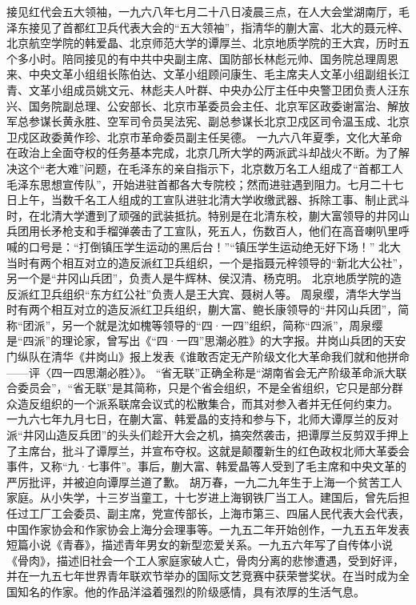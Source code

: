 \begin{maonote}
接见红代会五大领袖，一九六八年七月二十八日凌晨三点，在人大会堂湖南厅，毛泽东接见了首都红卫兵代表大会的“五大领袖”，指清华的蒯大富、北大的聂元梓、北京航空学院的韩爱晶、北京师范大学的谭厚兰、北京地质学院的王大宾，历时五个多小时。陪同接见的有中共中央副主席、国防部长林彪元帅、国务院总理周恩来、中央文革小组组长陈伯达、文革小组顾问康生、毛主席夫人文革小组副组长江青、文革小组成员姚文元、林彪夫人叶群、中央办公厅主任中央警卫团负责人汪东兴、国务院副总理、公安部长、北京市革委员会主任、北京军区政委谢富治、解放军总参谋长黄永胜、空军司令员吴法宪、副总参谋长北京卫戍区司令温玉成、北京卫戍区政委黄作珍、北京市革命委员副主任吴德。
一九六八年夏季，文化大革命在政治上全面夺权的任务基本完成，北京几所大学的两派武斗却战火不断。为了解决这个“老大难”问题，在毛泽东的亲自指示下，北京数万名工人组成了“首都工人毛泽东思想宣传队”，开始进驻首都各大专院校；然而进驻遇到阻力。七月二十七日上午，当数千名工人组成的工宣队进驻北清大学收缴武器、拆除工事、制止武斗时，在北清大学遭到了顽强的武装抵抗。特别是在北清东校，蒯大富领导的井冈山兵团用长矛枪支和手榴弹袭击了工宣队，死五人，伤数百人，他们在高音喇叭里呼喊的口号是：“打倒镇压学生运动的黑后台！”“镇压学生运动绝无好下场！”
北大当时有两个相互对立的造反派红卫兵组织，一个是指聂元梓领导的“新北大公社”，另一个是“井冈山兵团”，负责人是牛辉林、侯汉清、杨克明。
北京地质学院的造反派红卫兵组织“东方红公社”负责人是王大宾、聂树人等。
周泉缨，清华大学当时有两个相互对立的造反派红卫兵组织，蒯大富、鲍长康领导的“井冈山兵团”，简称“团派”，另一个就是沈如槐等领导的“四·一四”组织，简称“四派”，周泉缨是“四派”的理论家，曾写出《“四·一四”思潮必胜》的大字报。井岗山兵团的天安门纵队在清华《井岗山》报上发表《谁敢否定无产阶级文化大革命我们就和他拼命——评〈四一四思潮必胜〉》。
“省无联”正确全称是“湖南省会无产阶级革命派大联合委员会”，“省无联”是其简称，只是个省会组织，不是全省组织，它只是部分群众造反组织的一个派系联席会议式的松散集合，而其对参入者并无任何约束力。
一九六七年九月七日，在蒯大富、韩爱晶的支持和参与下，北师大谭厚兰的反对派“井冈山造反兵团”的头头们趁开大会之机，搞突然袭击，把谭厚兰反剪双手押上了主席台，批斗了谭厚兰，并宣布夺权。这就是颠覆新生的红色政权北师大革委会事件，又称“九·七事件”。事后，蒯大富、韩爱晶等人受到了毛主席和中央文革的严厉批评，并被迫向谭厚兰道了歉。
胡万春，一九二九年生于上海一个贫苦工人家庭。从小失学，十三岁当童工，十七岁进上海钢铁厂当工人。建国后，曾先后担任过工厂工会委员、副主席，党宣传部长，上海市第三、四届人民代表大会代表，中国作家协会和作家协会上海分会理事等。一九五二年开始创作，一九五五年发表短篇小说《青春》，描述青年男女的新型恋爱关系。一九五六年写了自传体小说《骨肉》，描述旧社会一个工人家庭家破人亡，骨肉分离的悲惨遭遇，受到好评，并在一九五七年世界青年联欢节举办的国际文艺竞赛中获荣誉奖状。在当时成为全国知名的作家。他的作品洋溢着强烈的阶级感情，具有浓厚的生活气息。

\end{maonote}
